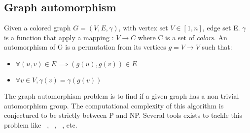 

\subsection{Graph automorphism}

Given a colored graph $G = (V, E, \gamma)$, with vertex set $V \in  [1, n] $, edge set E.
$\gamma$ is a function that apply a mapping : $V \rightarrow C$ where C is a set of \emph{colors}.
An automorphism of G is a permutation from its vertices $g = V \rightarrow V$ 
such that:
\begin{itemize}
	\item $\forall (u, v) \in E \implies (g(u), g(v)) \in E$
	\item $\forall v \in V, \gamma(v) = \gamma(g(v))$
\end{itemize}

The graph automorphism problem is to find if a given graph has a non trivial automorphism group. 
The computational complexity of this algorithm is conjectured to be strictly between P and NP.
Several tools exists to tackle this problem like \saucy~\cite{katebi2010symmetry},
 \bliss~\cite{JunttilaKaski:ALENEX2007}, \nauty~\cite{mckay2003nauty},
 etc.


